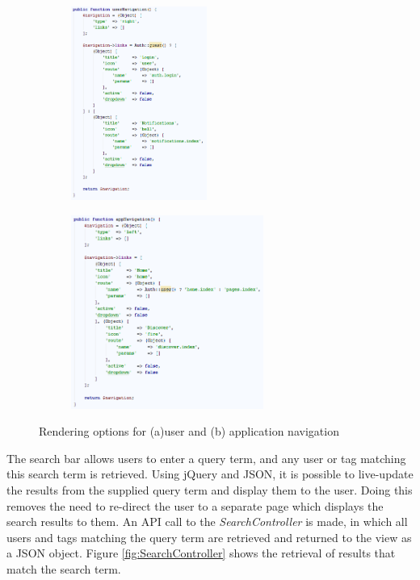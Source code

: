 \begin{figure}[H]
\centering
\begin{subfigure}[b]{0.45\linewidth}
	\includegraphics[height=2.5in]{Images/Implementation/UserNavigation}
	\caption{}
	\label{fig:UserNavigation}
\end{subfigure}
\begin{subfigure}[b]{0.45\linewidth}
	\includegraphics[height=2.5in]{Images/Implementation/AppNavigation}
	\caption{}
	\label{fig:AppNavigation}
\end{subfigure}
\caption{Rendering options for (a)user and (b) application navigation}
\label{fig:LayoutComposerNav}
\end{figure}

\noindent The search bar allows users to enter a query term, and any user or tag matching this search term is retrieved. Using jQuery and JSON, it is possible to live-update the results from the supplied query term and display them to the user. Doing this removes the need to re-direct the user to a separate page which displays the search results to them. An API call to the \textit{SearchController} is made, in which all users and tags matching the query term are retrieved and returned to the view as a JSON object. Figure \ref{fig:SearchController} shows the retrieval of results that match the search term.

